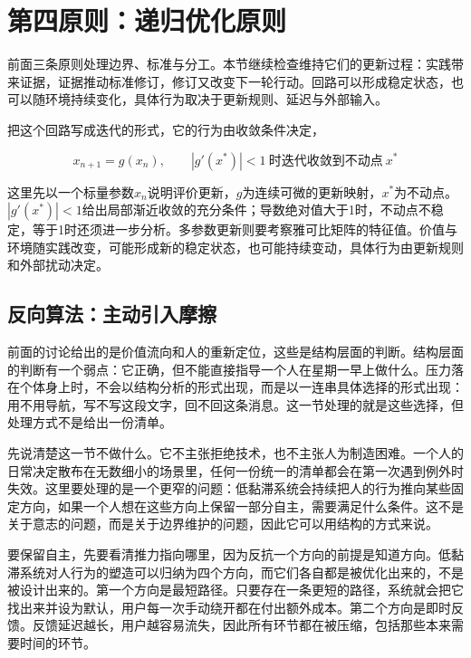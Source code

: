 \section{第四原则：递归优化原则}

前面三条原则处理边界、标准与分工。本节继续检查维持它们的更新过程：实践带来证据，证据推动标准修订，修订又改变下一轮行动。回路可以形成稳定状态，也可以随环境持续变化，具体行为取决于更新规则、延迟与外部输入。

把这个回路写成迭代的形式，它的行为由收敛条件决定，

\begin{equation}
x_{n+1}=g(x_{n}),\qquad \left|g'(x^{*})\right|<1\ \text{时迭代收敛到不动点}\ x^{*}
\end{equation}

这里先以一个标量参数$x_n$说明评价更新，$g$为连续可微的更新映射，$x^*$为不动点。$|g'(x^*)|<1$给出局部渐近收敛的充分条件；导数绝对值大于1时，不动点不稳定，等于1时还须进一步分析。多参数更新则要考察雅可比矩阵的特征值。价值与环境随实践改变，可能形成新的稳定状态，也可能持续变动，具体行为由更新规则和外部扰动决定。

\subsection{反向算法：主动引入摩擦}


前面的讨论给出的是价值流向和人的重新定位，这些是结构层面的判断。结构层面的判断有一个弱点：它正确，但不能直接指导一个人在星期一早上做什么。压力落在个体身上时，不会以结构分析的形式出现，而是以一连串具体选择的形式出现：用不用导航，写不写这段文字，回不回这条消息。这一节处理的就是这些选择，但处理方式不是给出一份清单。

先说清楚这一节不做什么。它不主张拒绝技术，也不主张人为制造困难。一个人的日常决定散布在无数细小的场景里，任何一份统一的清单都会在第一次遇到例外时失效。这里要处理的是一个更窄的问题：低黏滞系统会持续把人的行为推向某些固定方向，如果一个人想在这些方向上保留一部分自主，需要满足什么条件。这不是关于意志的问题，而是关于边界维护的问题，因此它可以用结构的方式来说。


要保留自主，先要看清推力指向哪里，因为反抗一个方向的前提是知道方向。低黏滞系统对人行为的塑造可以归纳为四个方向，而它们各自都是被优化出来的，不是被设计出来的。第一个方向是最短路径。只要存在一条更短的路径，系统就会把它找出来并设为默认，用户每一次手动绕开都在付出额外成本。第二个方向是即时反馈。反馈延迟越长，用户越容易流失，因此所有环节都在被压缩，包括那些本来需要时间的环节。

